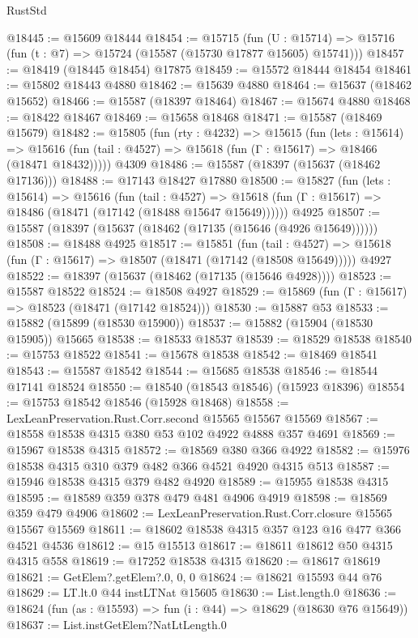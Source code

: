 \begin{lexlean}{RustStd}
\begin{coremodule}
@18445 := @15609 @18444
@18454 := @15715
    (fun (U : @15714) => @15716 (fun (t : @7) => @15724 (@15587 (@15730 @17877 @15605) @15741)))
@18457 := @18419 (@18445 @18454) @17875
@18459 := @15572 @18444 @18454
@18461 := @15802 @18443 @4880
@18462 := @15639 @4880
@18464 := @15637 (@18462 @15652)
@18466 := @15587 (@18397 @18464)
@18467 := @15674 @4880
@18468 := @18422 @18467
@18469 := @15658 @18468
@18471 := @15587 (@18469 @15679)
@18482 := @15805
    (fun (rty : @4232) =>
    @15615
      (fun (lets : @15614) =>
      @15616 (fun (tail : @4527) => @15618 (fun (Γ : @15617) => @18466 (@18471 @18432)))))
    @4309
@18486 := @15587 (@18397 (@15637 (@18462 @17136)))
@18488 := @17143 @18427 @17880
@18500 := @15827
    (fun (lets : @15614) =>
    @15616
      (fun (tail : @4527) =>
      @15618 (fun (Γ : @15617) => @18486 (@18471 (@17142 (@18488 @15647 @15649))))))
    @4925
@18507 := @15587 (@18397 (@15637 (@18462 (@17135 (@15646 (@4926 @15649))))))
@18508 := @18488 @4925
@18517 := @15851
    (fun (tail : @4527) => @15618 (fun (Γ : @15617) => @18507 (@18471 (@17142 (@18508 @15649)))))
    @4927
@18522 := @18397 (@15637 (@18462 (@17135 (@15646 @4928))))
@18523 := @15587 @18522
@18524 := @18508 @4927
@18529 := @15869 (fun (Γ : @15617) => @18523 (@18471 (@17142 @18524)))
@18530 := @15887 @53
@18533 := @15882 (@15899 (@18530 @15900))
@18537 := @15882 (@15904 (@18530 @15905)) @15665
@18538 := @18533 @18537
@18539 := @18529 @18538
@18540 := @15753 @18522
@18541 := @15678 @18538
@18542 := @18469 @18541
@18543 := @15587 @18542
@18544 := @15685 @18538
@18546 := @18544 @17141 @18524
@18550 := @18540 (@18543 @18546) (@15923 @18396)
@18554 := @15753 @18542 @18546 (@15928 @18468)
@18558 := LexLeanPreservation.Rust.Corr.second @15565 @15567 @15569
@18567 := @18558 @18538 @4315 @380 @53 @102 @4922 @4888 @357 @4691
@18569 := @15967 @18538 @4315
@18572 := @18569 @380 @366 @4922
@18582 := @15976 @18538 @4315 @310 @379 @482 @366 @4521 @4920 @4315 @513
@18587 := @15946 @18538 @4315 @379 @482 @4920
@18589 := @15955 @18538 @4315
@18595 := @18589 @359 @378 @479 @481 @4906 @4919
@18598 := @18569 @359 @479 @4906
@18602 := LexLeanPreservation.Rust.Corr.closure @15565 @15567 @15569
@18611 := @18602 @18538 @4315 @357 @123 @16 @477 @366 @4521 @4536
@18612 := @15 @15513
@18617 := @18611 @18612 @50 @4315 @4315 @558
@18619 := @17252 @18538 @4315
@18620 := @18617 @18619
@18621 := GetElem?.getElem?.{0, 0, 0}
@18624 := @18621 @15593 @44 @76
@18629 := LT.lt.{0} @44 instLTNat @15605
@18630 := List.length.{0}
@18636 := @18624 (fun (as : @15593) => fun (i : @44) => @18629 (@18630 @76 @15649))
@18637 := List.instGetElem?NatLtLength.{0}

\end{coremodule}
\end{lexlean}
